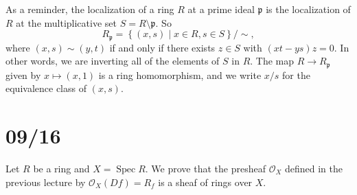 \documentclass[11pt,leqno]{article}
\theoremstyle{plain}
\theoremstyle{definition}
\numberwithin{equation}{section}
\numberwithin{lem}{section}
\newcommand{\cbr}[1]{\left\{#1\right\}}
\DeclareMathOperator{\Spec}{Spec}
\begin{document}
As a reminder, the localization of a ring $R$ at a prime ideal $\mathfrak p$ is the localization of $R$ at the multiplicative set $S = R\setminus \mathfrak p$. So 
\begin{equation}
  R_{\mathfrak p} = \cbr{(x,s)\mid x\in R, s\in S}/\!\sim, 
\end{equation}
where $(x,s)\sim (y,t)$ if and only if there exists $z\in S$ with $(xt-ys)z = 0$. In other words, we are inverting all of the elements of $S$ in $R$. The map $R\to R_{\mathfrak p}$ given by $x\mapsto (x,1)$ is a ring homomorphism, and we write $x/s$ for the equivalence class of $(x,s)$.

\newpage\section{09/16}
Let $R$ be a ring and $X = \Spec R$. We prove that the presheaf $\mathscr O_X$ defined in the previous lecture by $\mathscr O_X(Df) = R_f$ is a sheaf of rings over $X$.







\end{document}
